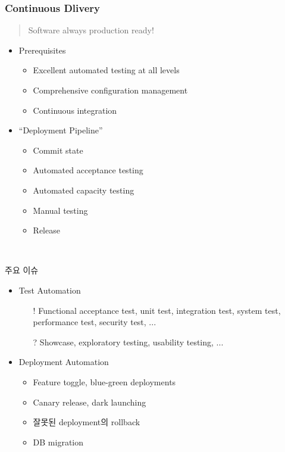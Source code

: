 \begin{frame}[allowframebreaks]
\frametitle{Continuous Dlivery}

\begin{quote}
Software always production ready!
\end{quote}

\begin{itemize}
  \item Prerequisites 
  \begin{itemize}
  \item Excellent automated testing at all levels
  \item Comprehensive configuration management
  \item Continuous integration
  \end{itemize}

  \item ``Deployment Pipeline''
  \begin{itemize}
  \item Commit state
  \item Automated acceptance testing
  \item Automated capacity testing
  \item Manual testing
  \item Release
  \end{itemize}
\end{itemize}

\pagebreak

\mbox{ }
\medskip

주요 이슈
 
\begin{itemize}
\item Test Automation
  \begin{itemize}
  \item[!] Functional acceptance test, unit test, integration test,
    system test, performance test, security test, ...
  \item[?] Showcase, exploratory testing, usability testing, ...
  \end{itemize}
\item Deployment Automation
  \begin{itemize}
  \item Feature toggle, blue-green deployments
  \item Canary release, dark launching
  \item 잘못된 deployment의 rollback
  \item DB migration %
  \end{itemize}
\end{itemize}


\end{frame}

